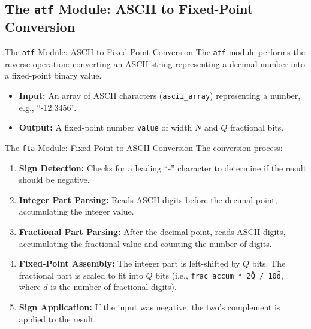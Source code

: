 \documentclass{beamer}
\theoremstyle{remark}
\begin{document}
\subsection{The \texttt{atf} Module: ASCII to Fixed-Point Conversion}
\begin{frame}{The \texttt{atf} Module: ASCII to Fixed-Point Conversion}
The \texttt{atf} module performs the reverse operation: converting an ASCII string representing a decimal number into a fixed-point binary value.

\begin{itemize}
    \item \textbf{Input:} An array of ASCII characters (\texttt{ascii\_array}) representing a number, e.g., ``-12.3456''.
    \item \textbf{Output:} A fixed-point number \texttt{value} of width $N$ and $Q$ fractional bits.
\end{itemize}
\end{frame}

\begin{frame}{The \texttt{fta} Module: Fixed-Point to ASCII Conversion}
The conversion process:
\begin{enumerate}
    \item \textbf{Sign Detection:} Checks for a leading ``-'' character to determine if the result should be negative.
    \item \textbf{Integer Part Parsing:} Reads ASCII digits before the decimal point, accumulating the integer value.
    \item \textbf{Fractional Part Parsing:} After the decimal point, reads ASCII digits, accumulating the fractional value and counting the number of digits.
    \item \textbf{Fixed-Point Assembly:} The integer part is left-shifted by $Q$ bits. The fractional part is scaled to fit into $Q$ bits (i.e., \texttt{frac\_accum * 2\^Q / 10\^d}, where $d$ is the number of fractional digits).
    \item \textbf{Sign Application:} If the input was negative, the two's complement is applied to the result.
\end{enumerate}
\end{frame}
\end{document}
